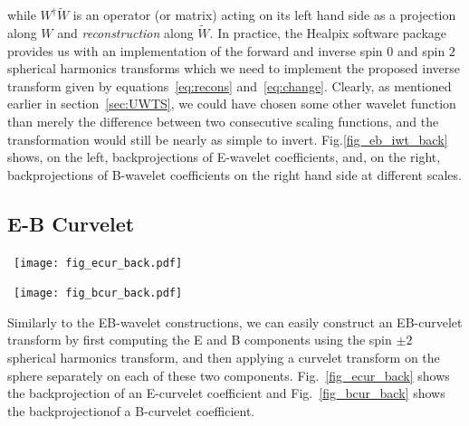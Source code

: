 while $W^\dagger \tilde{W}$ is an operator (or matrix) acting on its left hand side as a projection along $W$ and \emph{reconstruction} 
along $\tilde{W}$. In practice, the Healpix software package provides us with an implementation of the forward and inverse spin $0$ and 
spin $2$ spherical harmonics transforms which we need to implement the proposed inverse transform given by equations~\ref{eq:recons} 
and~\ref{eq:change}. Clearly, as mentioned earlier in section~\ref{sec:UWTS}, we could have chosen some other wavelet function than merely 
the difference between two consecutive scaling functions, and the transformation would still be nearly as simple to invert. Fig.\ref{fig_eb_iwt_back} 
shows, on the left, backprojections of E-wavelet coefficients, and, on the right, backprojections of B-wavelet coefficients on the right hand side at different scales.

\subsection*{E-B  Curvelet}
\begin{figure*}[htb]
\centerline{
\vbox{
 \hbox{
 \texttt{[image: fig\_ecur\_back.pdf]}
 }
  }
 }
\caption{E-curvelet coefficient backprojection.}
\label{fig_ecur_back}
\end{figure*}

\begin{figure*}[htb]
\centerline{
\vbox{
 \hbox{
 \texttt{[image: fig\_bcur\_back.pdf]}
 }
 }
 }
\caption{B-curvelet coefficient backprojection.}
\label{fig_bcur_back}
\end{figure*}
Similarly to the EB-wavelet constructions, we can easily construct an EB-curvelet transform by first computing the E and B components using 
the spin $\pm 2$ spherical harmonics transform, and then applying a curvelet transform on the sphere separately on each of these two components.
Fig.~\ref{fig_ecur_back} shows the backprojection of an E-curvelet coefficient and Fig.~\ref{fig_bcur_back} shows the backprojectionof a B-curvelet coefficient.

